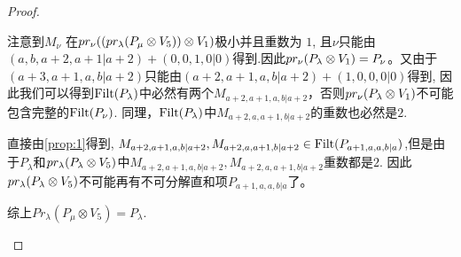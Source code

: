 \begin{proof}
\begin{enumerate}
\begin{enumerate}
\begin{enumerate}
注意到$M_\nu$ 在$pr_\nu ( ( pr_\lambda(P_\mu \otimes V_{5}) ) \otimes V_1 )$极小并且重数为 $1$, 且$\nu$只能由$ (a,b,a+2,a+1|a+2) + (0,0,1,0|0)$得到.因此$pr_\nu(P_\lambda \otimes V_1) = P_\nu$。又由于$(a+3,a+1,a,b|a+2)$只能由$(a+2,a+1,a,b|a+2) + (1,0,0,0|0)$得到, 因此我们可以得到$\operatorname{Filt}(P_{\lambda})$中必然有两个$M_{a+2,a+1,a,b|a+2}$，否则$pr_\nu(P_\lambda \otimes V_1)$不可能包含完整的$\operatorname{Filt}(P_\nu)$.
同理，$\operatorname{Filt}(P_{\lambda})$中$M_{a+2,a,a+1,b|a+2}$的重数也必然是$2$.

直接由\cref{prop:1}得到, $ M_{a+2,a+1,a,b|a+2},M_{a+2,a,a+1,b|a+2} \in \operatorname{Filt}(P_{a+1,a,a,b|a})$,但是由于$P_{\lambda}$和$pr_\lambda(P_\lambda \otimes V_{5})$中$ M_{a+2,a+1,a,b|a+2},M_{a+2,a,a+1,b|a+2}$重数都是$2$. 因此$pr_\lambda(P_\lambda \otimes V_{5})$不可能再有不可分解直和项$P_{a+1,a,a,b|a}$了。

综上$Pr_{\lambda}(P_\mu \otimes V_{5}) = P_\lambda  $.



\end{enumerate}
\end{enumerate}
\end{enumerate}
\end{proof}
